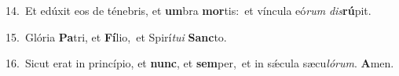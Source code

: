 {\numbfont\textcolor{\numbcolor}{14.}}~Et edúxit eos de ténebris, et \textbf{um}\-bra \textbf{mor}\-tis:~\star et víncula eó\textit{rum} \textit{dis}\-\textbf{rú}pit.\par
{\numbfont\textcolor{\numbcolor}{15.}}~Glória \textbf{Pa}\-tri, et \textbf{Fí}\-lio,~\star et Spirí\-\textit{tu}\-\textit{i} \textbf{Sanc}\-to.\par
{\numbfont\textcolor{\numbcolor}{16.}}~Sicut erat in princípio, et \textbf{nunc}\-, et \textbf{sem}\-per,~\star et in sǽcula sæcu\-\textit{ló}\-\textit{rum}. \textbf{A}\-men.\par
